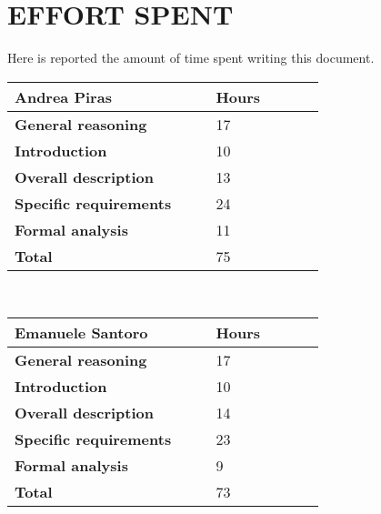 \chapter{EFFORT SPENT}
\label{ch:effortSpent}%
Here is reported the amount of time spent writing this document.
\\[10pt]
\begin{table}[H]
\centering 
    \begin{tabular}{| p{0.55\linewidth} | p{0.30\linewidth} |}
    \hline
    \rowcolor{bluepoli!40}
    \textbf{Andrea Piras} & \textbf{Hours}\T\B \\    
    \hline \hline
    \textbf{General reasoning} & 17 \T\B \\
    \hline 
    \textbf{Introduction} & 10 \T\B \\
    \hline 
    \textbf{Overall description} & 13 \T\B \\
    \hline 
    \textbf{Specific requirements} & 24 \T\B \\
    \hline 
    \textbf{Formal analysis} & 11 \T\B \\
    \hline
    \textbf{Total} & 75 \T\B \\
    \hline
    \end{tabular}
    \\[10pt]
\end{table}
\begin{table}[H]
\centering 
    \begin{tabular}{| p{0.55\linewidth} | p{0.30\linewidth} |}
    \hline
    \rowcolor{bluepoli!40}
    \textbf{Emanuele Santoro} & \textbf{Hours}\T\B \\    
    \hline \hline
    \textbf{General reasoning} & 17 \T\B \\
    \hline 
    \textbf{Introduction} & 10 \T\B \\
    \hline 
    \textbf{Overall description} & 14 \T\B \\
    \hline 
    \textbf{Specific requirements} & 23 \T\B \\
    \hline 
    \textbf{Formal analysis} & 9 \T\B \\
    \hline
    \textbf{Total} & 73 \T\B \\
    \hline
    \end{tabular}
    \\[10pt]
\end{table}
